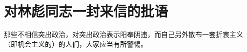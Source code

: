 \section[对林彪同志一封来信的批语（一九六五年十二月二日）]{对林彪同志一封来信的批语}


那些不相信突出政治，对突出政治表示阳奉阴违，而自己另外散布一套折衷主义（即机会主义的）的人们，大家应当有所警惕。


